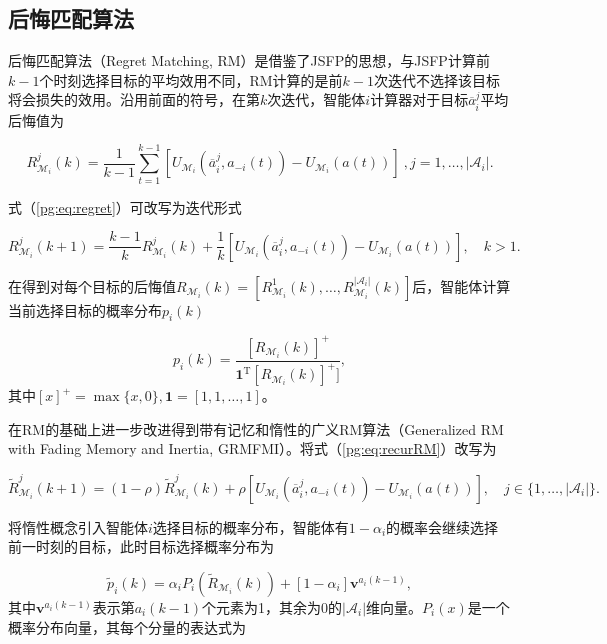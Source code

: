 \subsection{后悔匹配算法}
\label{upgta:protocal:RM}

后悔匹配算法（Regret Matching, RM）是借鉴了JSFP的思想，与JSFP计算前$k-1$个时刻选择目标的平均效用不同，RM计算的是前$k-1$次迭代不选择该目标将会损失的效用。沿用前面的符号，在第$k$次迭代，智能体$i$计算器对于目标$\overline a_i^j$平均后悔值为

\begin{equation}
\label{pg:eq:regret}
	R_{\mathcal{M}_i}^j(k) = \frac{1}{k-1}\sum_{t=1}^{k-1} [U_{\mathcal{M}_i}(\overline a_i^j, a_{-i}(t)) - U_{\mathcal{M}_i}(a(t))]\ ,j=1,\dots,|\mathcal{A}_i|.
\end{equation}

式（\ref{pg:eq:regret}）可改写为迭代形式

\begin{equation}
\label{pg:eq:recurRM}
	R_{\mathcal{M}_i}^j(k+1) = \frac{k-1}{k}R_{\mathcal{M}_i}^j(k) + \frac{1}{k} [U_{\mathcal{M}_i}(\overline a_i^j, a_{-i}(t)) - U_{\mathcal{M}_i}(a(t))],\quad k>1.
\end{equation}

在得到对每个目标的后悔值$R_{\mathcal{M}_i}(k)=[R_{\mathcal{M}_i}^1(k),\dots,R_{\mathcal{M}_i}^{|\mathcal{A}_i|}(k)]$后，智能体计算当前选择目标的概率分布$p_i(k)$

\begin{equation}
\label{pg:eq:rmpdf}
	p_i(k) = \frac{[R_{\mathcal{M}_i}(k)]^+}{{\bm 1}^{\mathrm T}[R_{\mathcal{M}_i}(k)]^+]},
\end{equation}
其中$[x]^+=\max\{x,0\},{\bm 1}=[1,1,\dots,1]$。

在RM的基础上进一步改进得到带有记忆和惰性的广义RM算法（Generalized RM with Fading Memory and Inertia, GRMFMI）。将式（\ref{pg:eq:recurRM}）改写为

\begin{equation}
	\widetilde R_{\mathcal{M}_i}^j(k+1) = (1-\rho)\widetilde R_{\mathcal{M}_i}^j(k) + \rho [U_{\mathcal{M}_i}(\overline a_i^j, a_{-i}(t)) - U_{\mathcal{M}_i}(a(t))],\quad j \in \{1,\dots,|\mathcal{A}_i|\}.
\end{equation}

将惰性概念引入智能体$i$选择目标的概率分布，智能体有$1-\alpha_i$的概率会继续选择前一时刻的目标，此时目标选择概率分布为

\begin{equation}
\label{pg:eq:interiapdf}
	\widetilde p_i(k) = \alpha_i P_i(\widetilde R_{\mathcal{M}_i}(k)) + [1-\alpha _i]{\bm v}^{a_i(k-1)},
\end{equation}
其中${\bm v}^{a_i(k-1)}$表示第$a_i(k-1)$个元素为1，其余为0的$|\mathcal{A}_i|$维向量。$P_i(x)$是一个概率分布向量，其每个分量的表达式为


